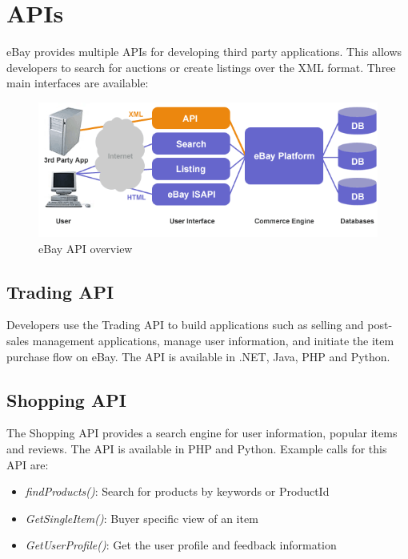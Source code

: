 \section{APIs}
eBay provides multiple APIs for developing third party applications. This allows developers to search for auctions or create listings over the XML format. Three main interfaces are available:
\begin{figure}[h!]
\centering
\includegraphics[scale=0.5]{images/api-flow.png}
\caption{eBay API overview}
\label{ebayAPI}
\end{figure}

\subsection{Trading API}
Developers use the Trading API to build applications such as selling and post-sales management applications, manage user information, and initiate the item purchase flow on eBay. The API is available in .NET, Java, PHP and Python.

\subsection{Shopping API}
The Shopping API provides a search engine for user information, popular items and reviews. The API is available in PHP and Python. Example calls for this API are:
\begin{itemize}
	\item \textit{findProducts()}: Search for products by keywords or ProductId
	\item \textit{GetSingleItem()}: Buyer specific view of an item
	\item \textit{GetUserProfile()}: Get the user profile and feedback information
\end{itemize}

